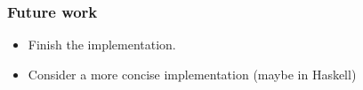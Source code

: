 \documentclass[t,24pt,serif,aspectratio=169]{beamer}
\begin{document}
\begin{frame}[hvid]
    \frametitle{Future work}

    \begin{itemize}
        \item Finish the implementation.
        \item Consider a more concise implementation (maybe in Haskell)
    \end{itemize}
\end{frame}
\end{document}

